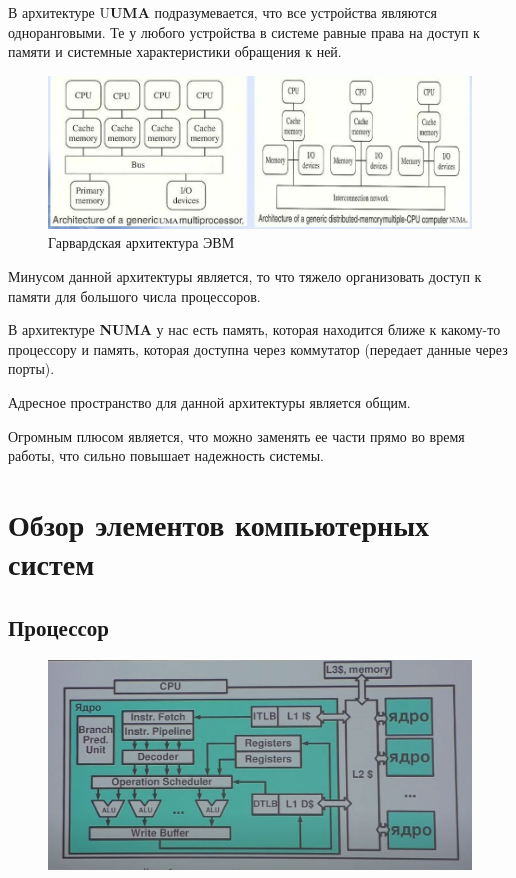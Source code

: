 \documentclass[bachelor, och, book]{SCWorks}
\theoremstyle{remark}
\begin{document}
    В архитектуре U\textbf{UMA} подразумевается, что все устройства являются одноранговыми. Те у любого устройства в системе равные права на доступ к памяти и системные характеристики обращения к ней. 

    \begin{figure}[H]
        \begin{center}
            \includegraphics[scale=0.5]{res/UMA-NUMA_architecture.png}
            \caption{Гарвардская архитектура ЭВМ}
        \end{center}
    \end{figure}

    Минусом данной архитектуры является, то что тяжело организовать доступ к памяти для большого числа процессоров.

    В архитектуре \textbf{NUMA} у нас есть память, которая находится ближе к какому-то процессору и память, которая доступна через коммутатор (передает данные через порты). 

    Адресное пространство для данной архитектуры является общим.

    Огромным плюсом является, что можно заменять ее части прямо во время работы, что сильно повышает надежность системы.

    \section{Обзор элементов компьютерных систем}
    
    \subsection{Процессор}
    \begin{figure}[H]
        \begin{center}
            \includegraphics[scale=0.5]{res/processor.png}
        \end{center}
    \end{figure}
\end{document}
